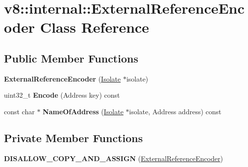 \hypertarget{classv8_1_1internal_1_1_external_reference_encoder}{}\section{v8\+:\+:internal\+:\+:External\+Reference\+Encoder Class Reference}
\label{classv8_1_1internal_1_1_external_reference_encoder}
\subsection*{Public Member Functions}
\begin{DoxyCompactItemize}
\item 
{\bfseries External\+Reference\+Encoder} (\hyperlink{classv8_1_1internal_1_1_isolate}{Isolate} $\ast$isolate)\hypertarget{classv8_1_1internal_1_1_external_reference_encoder_a6a214ce4f5b34106c1147943237aee2e}{}\label{classv8_1_1internal_1_1_external_reference_encoder_a6a214ce4f5b34106c1147943237aee2e}

\item 
uint32\+\_\+t {\bfseries Encode} (Address key) const \hypertarget{classv8_1_1internal_1_1_external_reference_encoder_af7f9a581682c421992278061622bbbc5}{}\label{classv8_1_1internal_1_1_external_reference_encoder_af7f9a581682c421992278061622bbbc5}

\item 
const char $\ast$ {\bfseries Name\+Of\+Address} (\hyperlink{classv8_1_1internal_1_1_isolate}{Isolate} $\ast$isolate, Address address) const \hypertarget{classv8_1_1internal_1_1_external_reference_encoder_a57942cf68173dde9434dba15c6b9bf3d}{}\label{classv8_1_1internal_1_1_external_reference_encoder_a57942cf68173dde9434dba15c6b9bf3d}

\end{DoxyCompactItemize}
\subsection*{Private Member Functions}
\begin{DoxyCompactItemize}
\item 
{\bfseries D\+I\+S\+A\+L\+L\+O\+W\+\_\+\+C\+O\+P\+Y\+\_\+\+A\+N\+D\+\_\+\+A\+S\+S\+I\+GN} (\hyperlink{classv8_1_1internal_1_1_external_reference_encoder}{External\+Reference\+Encoder})\hypertarget{classv8_1_1internal_1_1_external_reference_encoder_a4d46e78a1002313e7c0378db72e5e7c7}{}\label{classv8_1_1internal_1_1_external_reference_encoder_a4d46e78a1002313e7c0378db72e5e7c7}

\end{DoxyCompactItemize}
